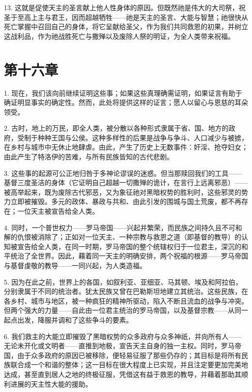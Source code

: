 13. 这就是促使天主的圣言献上他人性身体的原因。但既然祂是伟大的大司祭，祝圣于至高上主与君王，因而超越牺牲——祂是天主的圣言、大能与智慧；祂很快从死亡掌握中召回自己的身体，将它呈献给圣父，作为我们共同救恩的初果，并树立这战利品，作为祂战胜死亡与撒殚以及废除人祭的明证，为全人类带来祝福。\par


\section{第十六章}

1. 现在，我们该向前继续证明这些事；如果这些真理确需证明，如果证言有助于确证明显事实的确定性。然而，此处将提供这样的证言；愿人以留心与恩慈的耳朵领受。\par

2. 古时，地上的万民，即全人类，被分散以各种形式隶属于省、国、地方的政府，受制于种种王国与公侯。这种多样性的后果是战争与争斗、人口减少与被掳，在乡村与城市中无休止地肆虐。由此，产生了历史上无数事件：奸淫、抢夺妇女；由此产生了特洛伊的苦难，与所有民族皆知的古代悲剧。\par

3. 这些事的起源可公正地归咎于多神论谬误的迷惑。但当那赎回我们的工具——基督三度圣洁的身体（它证明自己超越一切撒殚的诡计，在言行上远离邪恶）——被高举起来，既为废除古代邪恶，又为象征祂对黑暗权势的胜利时，这些邪灵的势力立即被摧毁。多元的政体、暴政与共和、由此引发的围城与国土荒废，都不再存在；一位天主被宣告给全人类。\par

4. 同时，一个普世权力——罗马帝国——兴起并繁荣，而民族之间持久且不可和解的仇恨被消除了；正如对一位天主、一种宗教与救恩之道（即基督的教导）的认知被宣告给全人类，在同一时期，罗马帝国的整个统辖权归于一位君主，深沉的和平统治了全世界。因此，藉着同一天主的明确安排，两个祝福的根源——罗马帝国与基督虔敬的教导——一同兴起，为人类造福。\par

5. 因为在此之前，世界上的各国，如叙利亚、亚细亚、马其顿、埃及和阿拉伯，分别隶属于不同的统治者。犹太民族又曾在巴勒斯坦地建立其统治。这些民族，在各乡村、城市与地区，被一种疯狂的精神所驱动，陷入不断且流血的战争与冲突。但两个强大的力量——自此由一位君主统治的罗马帝国，以及基督宗教——从同一起点出发，降服并调和了这些争斗的要素。\par

6. 我们救主的大能立即摧毁了黑暗权势的众多政府与众多神祇，并向所有人——无论未开化或文明者——直推到地极，宣告天主自身的独一主权。同时，罗马帝国，由于众多政府的原因已被移除，便轻易征服了那些仍存的；其目标是将所有民族联合成一个和谐的整体；这一目标在很大程度上已实现，并且注定要更加完美地达成，甚至直到居人之地的终极征服，凭借这有益于救恩的教导，并藉着那助其顺利进展的天主性大能的援助。\par

